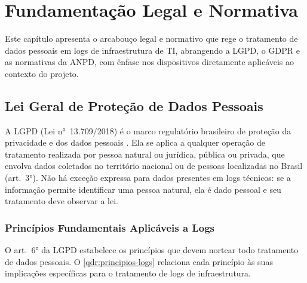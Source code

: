 
\chapter{Fundamentação Legal e Normativa}
\label{cap:legal}

Este capítulo apresenta o arcabouço legal e normativo que rege o tratamento de dados pessoais em logs de infraestrutura de TI, abrangendo a LGPD, o GDPR e as normativas da ANPD, com ênfase nos dispositivos diretamente aplicáveis ao contexto do projeto.

\section{Lei Geral de Proteção de Dados Pessoais}
\label{sec:lgpd}

A LGPD (Lei n°~13.709/2018) é o marco regulatório brasileiro de proteção da privacidade e dos dados pessoais \cite{brasil2018lgpd}. Ela se aplica a qualquer operação de tratamento realizada por pessoa natural ou jurídica, pública ou privada, que envolva dados coletados no território nacional ou de pessoas localizadas no Brasil (art.\ 3°). Não há exceção expressa para dados presentes em logs técnicos: se a informação permite identificar uma pessoa natural, ela é dado pessoal e seu tratamento deve observar a lei.

\subsection{Princípios Fundamentais Aplicáveis a Logs}
\label{subsec:principios}

O art.\ 6° da LGPD estabelece os princípios que devem nortear todo tratamento de dados pessoais. O \autoref{qdr:principios-logs} relaciona cada princípio às suas implicações específicas para o tratamento de logs de infraestrutura.

